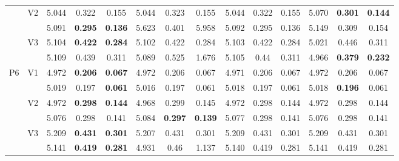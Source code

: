 \documentclass[12pt,a4paper]{article}
\begin{document}
\begin{sidewaystable}[ht]
{\begin{tabular}{cc|ccc|ccc|ccc|ccc|}
   & \multirow{2}{*}{V2} & 5.044 & 0.322 & 0.155 & 5.044 & 0.323 & 0.155 & 5.044 & 0.322 & 0.155 & 5.070 & \textbf{0.301} & \textbf{0.144} \\ 
   &  & 5.091 & \textbf{0.295} & \textbf{0.136} & 5.623 & 0.401 & 5.958 & 5.092 & 0.295 & 0.136 & 5.149 & 0.309 & 0.154 \\ 
   & \multirow{2}{*}{V3} & 5.104 & \textbf{0.422} & \textbf{0.284} & 5.102 & 0.422 & 0.284 & 5.103 & 0.422 & 0.284 & 5.021 & 0.446 & 0.311 \\ 
   &  & 5.109 & 0.439 & 0.311 & 5.089 & 0.525 & 1.676 & 5.105 & 0.44 & 0.311 & 4.966 & \textbf{0.379} & \textbf{0.232} \\ 
   \hline \hline\multirow{6}{*}{P6} & \multirow{2}{*}{V1} & 4.972 & \textbf{0.206} & \textbf{0.067} & 4.972 & 0.206 & 0.067 & 4.971 & 0.206 & 0.067 & 4.972 & 0.206 & 0.067 \\ 
   &  & 5.019 & 0.197 & \textbf{0.061} & 5.016 & 0.197 & 0.061 & 5.018 & 0.197 & 0.061 & 5.018 & \textbf{0.196} & 0.061 \\ 
   & \multirow{2}{*}{V2} & 4.972 & \textbf{0.298} & \textbf{0.144} & 4.968 & 0.299 & 0.145 & 4.972 & 0.298 & 0.144 & 4.972 & 0.298 & 0.144 \\ 
   &  & 5.076 & 0.298 & 0.141 & 5.084 & \textbf{0.297} & \textbf{0.139} & 5.077 & 0.298 & 0.141 & 5.076 & 0.298 & 0.141 \\ 
   & \multirow{2}{*}{V3} & 5.209 & \textbf{0.431} & \textbf{0.301} & 5.207 & 0.431 & 0.301 & 5.209 & 0.431 & 0.301 & 5.209 & 0.431 & 0.301 \\ 
   &  & 5.141 & \textbf{0.419} & \textbf{0.281} & 4.931 & 0.46 & 1.137 & 5.140 & 0.419 & 0.281 & 5.141 & 0.419 & 0.281 \\ 
   \hline
\end{tabular}
}
\end{sidewaystable}
\end{document}
